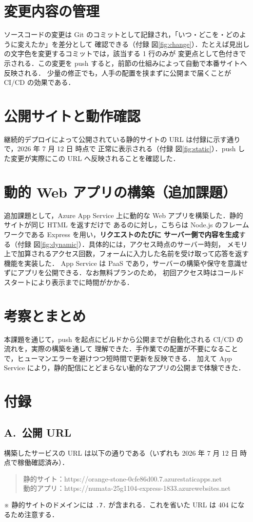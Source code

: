 \documentclass[uplatex,dvipdfmx,a4paper,11pt]{jsarticle}
\begin{document}
\section{変更内容の管理}
ソースコードの変更は Git のコミットとして記録され，「いつ・どこを・どのように変えたか」を差分として
確認できる（付録 図\ref{fig:change}）．たとえば見出しの文字色を変更するコミットでは，該当する 1 行のみが
変更点として色付きで示される．この変更を push すると，前節の仕組みによって自動で本番サイトへ反映される．
少量の修正でも，人手の配置を挟まずに公開まで届くことが CI/CD の効果である．

\section{公開サイトと動作確認}
継続的デプロイによって公開されている静的サイトの URL は付録に示す通りで，2026 年 7 月 12 日 時点で
正常に表示される（付録 図\ref{fig:static}）．push した変更が実際にこの URL へ反映されることを確認した．

\section{動的 Web アプリの構築（追加課題）}
追加課題として，Azure App Service 上に動的な Web アプリを構築した．静的サイトが同じ HTML を返すだけで
あるのに対し，こちらは Node.js のフレームワークである Express を用い，\textbf{リクエストのたびに
サーバー側で内容を生成}する（付録 図\ref{fig:dynamic}）．具体的には，アクセス時点のサーバー時刻，
メモリ上で加算されるアクセス回数，フォームに入力した名前を受け取って応答を返す機能を実装した．
App Service は PaaS であり，サーバーの構築や保守を意識せずにアプリを公開できる．なお無料プランのため，
初回アクセス時はコールドスタートにより表示までに時間がかかる．

\section{考察とまとめ}
本課題を通じて，push を起点にビルドから公開までが自動化される CI/CD の流れを，実際の構築を通して
理解できた．手作業での配置が不要になることで，ヒューマンエラーを避けつつ短時間で更新を反映できる．
加えて App Service により，静的配信にとどまらない動的なアプリの公開まで体験できた．

\section*{付録}
\subsection*{A.\ 公開 URL}
構築したサービスの URL は以下の通りである（いずれも 2026 年 7 月 12 日 時点で稼働確認済み）．
\begin{quote}\ttfamily\small
静的サイト：https://orange-stone-0cfe86d00.7.azurestaticapps.net\\
動的アプリ：https://numata-25g1104-express-1833.azurewebsites.net
\end{quote}
※ 静的サイトのドメインには \texttt{.7.} が含まれる．これを省いた URL は 404 になるため注意する．
\end{document}
